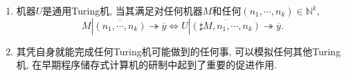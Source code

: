 \begin{solution}
    \begin{enumerate}[label=(\arabic*)]
        \item 机器$U$是通用Turing机, 当其满足对任何机器$M$和任何$(n_1,\cdots,n_k)\in\mathbb{N}^k$,
        $$M|\overline{(n_1,\cdots,n_k)}\twoheadrightarrow \overline{y}\Leftrightarrow U|\overline{(\sharp M, n_1, \cdots, n_k)}\twoheadrightarrow \overline{y}.$$
        \item 其凭自身就能完成任何Turing机可能做到的任何事, 可以模拟任何其他Turing机, 在早期程序储存式计算机的研制中起到了重要的促进作用.
    \end{enumerate}
\end{solution}
